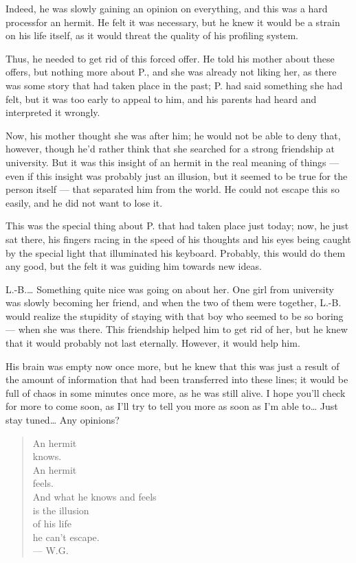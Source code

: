 Indeed, he was slowly gaining an opinion on everything, and this was a hard processfor an hermit. He felt it was necessary, but he knew it would be a strain on his life itself, as it would threat the quality of his profiling system.

Thus, he needed to get rid of this forced offer. He told his mother about these offers, but nothing more about P., and she was already not liking her, as there was some story that had taken place in the past; P. had said something she had felt, but it was too early to appeal to him, and his parents had heard and interpreted it wrongly.

Now, his mother thought she was after him; he would not be able to deny that, however, though he'd rather think that she searched for a strong friendship at university. But it was this insight of an hermit in the real meaning of things --- even if this insight was probably just an illusion, but it seemed to be true for the person itself --- that separated him from the world. He could not escape this so easily, and he did not want to lose it.

This was the special thing about P. that had taken place just today; now, he just sat there, his fingers racing in the speed of his thoughts and his eyes being caught by the special light that illuminated his keyboard. Probably, this would do them any good, but the felt it was guiding him towards new ideas.

L.-B.\ldots
Something quite nice was going on about her. One girl from university was slowly becoming her friend, and when the two of them were together, L.-B. would realize the stupidity of staying with that boy who seemed to be so boring --- when she was there. This friendship helped him to get rid of her, but he knew that it would probably not last eternally. However, it would help him.

His brain was empty now once more, but he knew that this was just a result of the amount of information that had been transferred into these lines; it would be full of chaos in some minutes once more, as he was still alive. 
I hope you'll check for more to come soon, as I'll try to tell you more as soon as I'm able to\ldots
Just stay tuned\ldots
Any opinions?

\begin{quote}
An hermit \\
knows. \\
An hermit \\
feels. \\
And what he knows and feels \\
is the illusion \\
of his life \\
he can't escape. \\
--- W.G.
\end{quote}

